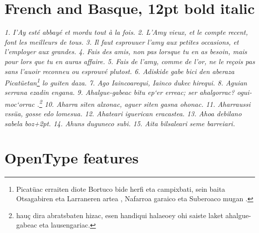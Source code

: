 \documentclass[12pt]{book}
\begin{document}
\section*{French and Basque, 12pt bold italic}

\textit{1. I'Ay esté abbayé et mordu tout à la fois.
2. L'Amy vieux, et le compte recent, font les meilleurs de tous.
3. Il faut esprouuer l'amy aux petites occasions, et l'employer aux grandes.
4. Fais des amis, non pas lorsque tu en as besoin, mais pour lors que tu en auras affaire.
5. Fais de l'amy, comme de l'or, ne le reçois pas sans l'auoir reconneu ou esprouvé plutost.
6. Adiskide gabe bici den aberaza Picatüetan\footnote{ Picatüac
  erraiten diote Bortuco bide herfi eta campixbati, sein baita
  Otsagabiren eta Larraneren artea , Nafarroa garaico eta Suberoaco
  mugan .} lo guiten daza. 7. Ago Iaincoarequi, Iainco dukec hirequi.
8. Aguian serrana ezadin engana.  9. Ahalgue-gabeac bitu ep‘er erreac;
ser ahalgorrac? ogui-moc‘orrac .\footnote{hauç dira abratsbaten hizac,
  esen handiqui halaeoey ohi saiste laket ahalgue-gabeac eta
  lausengariac.}  10. Aharra siten alxonac, aguer siten gasna
ohonac. 11. Aharraussi vssüa, gosse edo lomesua.
12. Ahateari iguerican eracastea. 13. Ahoa debilano sabela boz\kern+2pt.
14. Ahuns duguneco subi. 15. Aita bilsaleari seme barreiari.}\pagebreak



\section*{OpenType features}
\end{document}
